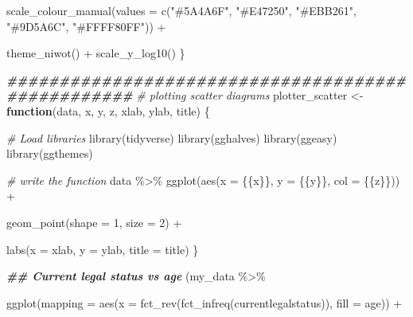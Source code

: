 \documentclass[a4paper,nobind]{templates/ociamthesis}
\newenvironment{Shaded}{\begin{snugshade}}{\end{snugshade}}
\newcommand{\AttributeTok}[1]{\textcolor[rgb]{0.77,0.63,0.00}{#1}}
\newcommand{\CommentTok}[1]{\textcolor[rgb]{0.56,0.35,0.01}{\textit{#1}}}
\newcommand{\ControlFlowTok}[1]{\textcolor[rgb]{0.13,0.29,0.53}{\textbf{#1}}}
\newcommand{\DecValTok}[1]{\textcolor[rgb]{0.00,0.00,0.81}{#1}}
\newcommand{\DocumentationTok}[1]{\textcolor[rgb]{0.56,0.35,0.01}{\textbf{\textit{#1}}}}
\newcommand{\FunctionTok}[1]{\textcolor[rgb]{0.00,0.00,0.00}{#1}}
\newcommand{\NormalTok}[1]{#1}
\newcommand{\OtherTok}[1]{\textcolor[rgb]{0.56,0.35,0.01}{#1}}
\newcommand{\SpecialCharTok}[1]{\textcolor[rgb]{0.00,0.00,0.00}{#1}}
\newcommand{\StringTok}[1]{\textcolor[rgb]{0.31,0.60,0.02}{#1}}
\renewenvironment{Shaded}
{
  \vspace{10pt}%
  \begin{snugshade}%
}{%
  \end{snugshade}%
  \vspace{8pt}%
}
\begin{document}
\begin{landscape}
\begin{Shaded}
\begin{Highlighting}[]
    \FunctionTok{scale\_colour\_manual}\NormalTok{(}\AttributeTok{values =} \FunctionTok{c}\NormalTok{(}\StringTok{"\#5A4A6F"}\NormalTok{, }\StringTok{"\#E47250"}\NormalTok{,  }\StringTok{"\#EBB261"}\NormalTok{, }\StringTok{"\#9D5A6C"}\NormalTok{, }\StringTok{"\#FFFF80FF"}\NormalTok{)) }\SpecialCharTok{+}
    
    \FunctionTok{theme\_niwot}\NormalTok{() }\SpecialCharTok{+} \FunctionTok{scale\_y\_log10}\NormalTok{()}
\NormalTok{\}}

\DocumentationTok{\#\#\#\#\#\#\#\#\#\#\#\#\#\#\#\#\#\#\#\#\#\#\#\#\#\#\#\#\#\#\#\#\#\#\#\#\#\#\#\#\#\#\#\#\#\#\#\#\#\#}
\CommentTok{\# plotting scatter diagrams }
\NormalTok{plotter\_scatter }\OtherTok{\textless{}{-}} \ControlFlowTok{function}\NormalTok{(data, x, y, z, }
\NormalTok{                            xlab, ylab, title) \{}
  
  \CommentTok{\# Load libraries}
  \FunctionTok{library}\NormalTok{(tidyverse)}
  \FunctionTok{library}\NormalTok{(gghalves)}
  \FunctionTok{library}\NormalTok{(ggeasy)}
  \FunctionTok{library}\NormalTok{(ggthemes)}
  
  \CommentTok{\# write the function}
\NormalTok{  data }\SpecialCharTok{\%\textgreater{}\%} \FunctionTok{ggplot}\NormalTok{(}\FunctionTok{aes}\NormalTok{(}\AttributeTok{x =}\NormalTok{ \{\{x\}\}, }\AttributeTok{y =}\NormalTok{ \{\{y\}\}, }\AttributeTok{col =}\NormalTok{ \{\{z\}\})) }\SpecialCharTok{+} 
    
    \FunctionTok{geom\_point}\NormalTok{(}\AttributeTok{shape =} \DecValTok{1}\NormalTok{, }\AttributeTok{size =} \DecValTok{2}\NormalTok{) }\SpecialCharTok{+} 
    
    \FunctionTok{labs}\NormalTok{(}\AttributeTok{x =}\NormalTok{ xlab, }\AttributeTok{y =}\NormalTok{ ylab, }\AttributeTok{title =}\NormalTok{ title)}
\NormalTok{\}}
\end{Highlighting}
\end{Shaded}

\begin{Shaded}
\begin{Highlighting}[]
\DocumentationTok{\#\# Current legal status vs age}
\NormalTok{(my\_data }\SpecialCharTok{\%\textgreater{}\%} 
  
  \FunctionTok{ggplot}\NormalTok{(}\AttributeTok{mapping =} \FunctionTok{aes}\NormalTok{(}\AttributeTok{x =} \FunctionTok{fct\_rev}\NormalTok{(}\FunctionTok{fct\_infreq}\NormalTok{(currentlegalstatus)), }\AttributeTok{fill =}\NormalTok{ age)) }\SpecialCharTok{+} 
  

\end{Highlighting}
\end{Shaded}
\end{landscape}
\end{document}

